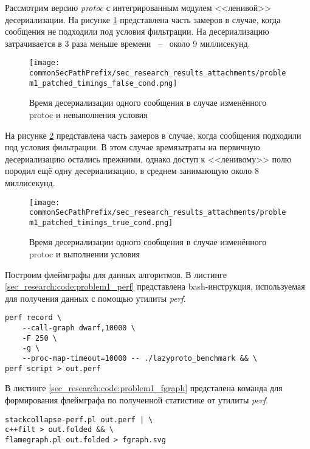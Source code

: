 Рассмотрим версию \textit{protoc} с интегрированным модулем <<ленивой>> десериализации.
На рисунке \ref{fig:problem1_patched_timings_false_cond} представлена часть замеров в случае, когда сообщения не подходили под условия фильтрации. На десериализацию затрачивается в 3 раза меньше времени ~--~ около 9 миллисекунд.

\begin{figure}[H]
    \centering
    \texttt{[image: \\commonSecPathPrefix/sec\_research\_results\_attachments/problem1\_patched\_timings\_false\_cond.png]}
    \caption{Время десериализации одного сообщения в случае изменённого protoc и невыполнения условия}
    \label{fig:problem1_patched_timings_false_cond}
\end{figure}

На рисунке \ref{fig:problem1_patched_timings_true_cond} представлена часть замеров в случае, когда сообщения подходили под условия фильтрации. В этом случае времязатраты на первичную десериализацию остались прежними, однако доступ к <<ленивому>> полю породил ещё одну десериализацию, в среднем занимающую около 8 миллисекунд. 

\begin{figure}[H]
    \centering
    \texttt{[image: \\commonSecPathPrefix/sec\_research\_results\_attachments/problem1\_patched\_timings\_true\_cond.png]}
    \caption{Время десериализации одного сообщения в случае изменённого protoc и выполнении условия}
    \label{fig:problem1_patched_timings_true_cond}
\end{figure}

Построим флеймграфы для данных алгоритмов. В листинге \ref{sec_research:code:problem1_perf} представлена bash-инструкция, используемая для получения данных с помощью утилиты \textit{perf}.

\begin{lstlisting}[style=CodeListing, captionpos=b, caption={bash-инструкция для сбора статистики утилитой perf}, label=sec_research:code:problem1_perf]
perf record \
    --call-graph dwarf,10000 \
    -F 250 \
    -g \
    --proc-map-timeout=10000 -- ./lazyproto_benchmark && \
perf script > out.perf
\end{lstlisting}

В листинге \ref{sec_research:code:problem1_fgraph} предсталена команда для формирования флеймграфа по полученной статистике от утилиты \textit{perf}.

\begin{lstlisting}[style=CodeListing, captionpos=b, caption={bash-инструкция для сбора статистики утилитой perf}, label=sec_research:code:problem1_fgraph]
stackcollapse-perf.pl out.perf | \
c++filt > out.folded && \
flamegraph.pl out.folded > fgraph.svg
\end{lstlisting}

